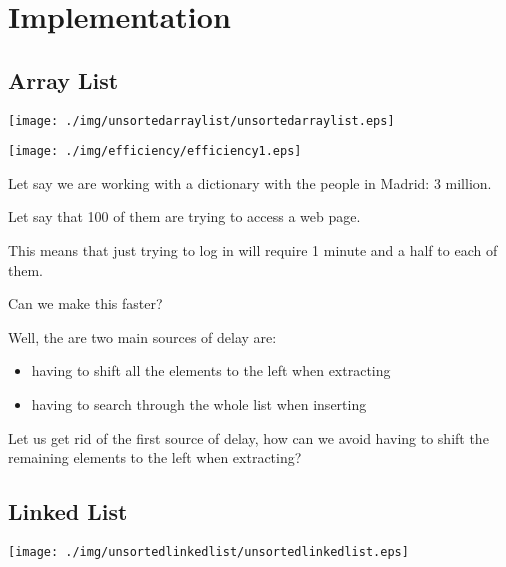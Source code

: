 \documentclass[a4paper, 9pt]{extarticle}
\begin{document}
\newpage

\section{Implementation}

\subsection{Array List}

\begin{center}
  \texttt{[image: ./img/unsortedarraylist/unsortedarraylist.eps]}
\end{center}

\begin{multicols}{2}
\begin{center}
  \texttt{[image: ./img/efficiency/efficiency1.eps]}
\end{center}
\columnbreak

Let say we are working with a dictionary with the people in Madrid: 3 million.

Let say that 100 of them are trying to access a web page.

This means that just trying to log in will require 1 minute and a half to each of them.

Can we make this faster?

Well, the are two main sources of delay are:

\begin{itemize}
  \item having to shift all the elements to the left when extracting
  \item having to search through the whole list when inserting
\end{itemize}

Let us get rid of the first source of delay, how can we avoid having to shift
the remaining elements to the left when extracting?

\end{multicols}

\newpage

\subsection{Linked List}

\begin{center}
  \texttt{[image: ./img/unsortedlinkedlist/unsortedlinkedlist.eps]}
\end{center}
\end{document}
